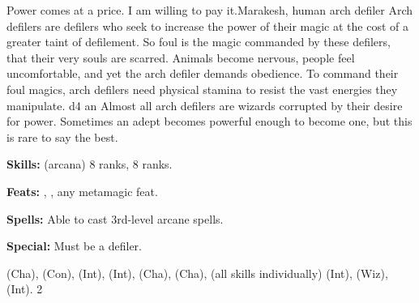 {Power comes at a price. I am willing to pay it.}{Marakesh, human arch defiler}
{Arch defilers are defilers who seek to increase the power of their magic at the cost of a greater taint of defilement. So foul is the magic commanded by these defilers, that their very souls are scarred. Animals become nervous, people feel uncomfortable, and yet the arch defiler demands obedience. To command their foul magics, arch defilers need physical stamina to resist the vast energies they manipulate.}
{d4}
{an}
{Almost all arch defilers are wizards corrupted by their desire for power. Sometimes an adept becomes powerful enough to become one, but this is rare to say the best.}
{\textbf{Skills:}  (arcana) 8 ranks,  8 ranks.

\textbf{Feats:} , , any metamagic feat.

\textbf{Spells:} Able to cast 3rd-level arcane spells.

\textbf{Special:} Must be a defiler.}
{ (Cha),  (Con),  (Int),  (Int),  (Cha),  (Cha),  (all skills individually) (Int),  (Wiz),  (Int).}
{2}
